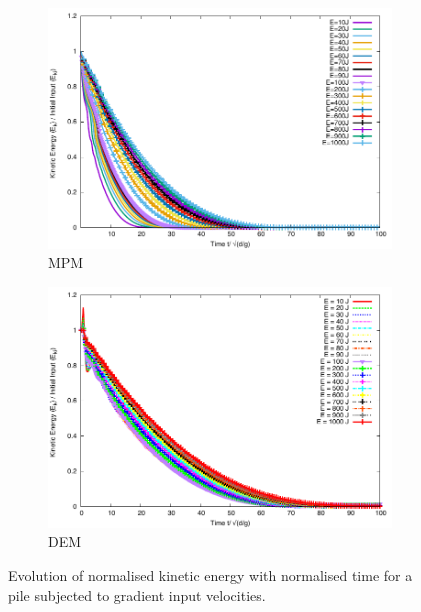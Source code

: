 \documentclass[3p,times,procedia,number]{elsarticle}
\begin{document}
\begin{figure}[tbhp]
  \centering
  \begin{subfigure}[b]{0.4\textwidth}
    \centering
    \includegraphics[width=\textwidth]{figs/Normalised_Energy_Time_Slope_MPM}
    \caption{MPM}
    \label{fig:Normalised_Energy_Time_Slope_MPM}
  \end{subfigure}
  \begin{subfigure}[b]{0.4\textwidth}
    \centering
    \includegraphics[width=\textwidth]{figs/Normalised_Energy_Time_Slope_DEM}
    \caption{DEM}
    \label{fig:Normalised_Energy_Time_Slope_DEM}
  \end{subfigure}
  \caption{Evolution of normalised kinetic energy with normalised time for a
  pile subjected to gradient input velocities.}
  \label{fig:Energy_Time_Slope}
\end{figure}
\end{document}
